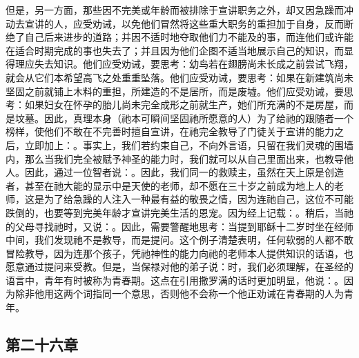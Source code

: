 但是，另一方面，那些因不完美或年龄而被排除于宣讲职务之外，却又因急躁而冲动去宣讲的人，应受劝诫，以免他们冒然将这些重大职务的重担加于自身，反而断绝了自己后来进步的道路；并因不适时地夺取他们力不能及的事，而连他们或许能在适合时期完成的事也失去了；并且因为他们企图不适当地展示自己的知识，而显得理应失去知识。他们应受劝诫，要思考：幼鸟若在翅膀尚未长成之前尝试飞翔，就会从它们本希望高飞之处重重坠落。他们应受劝诫，要思考：如果在新建筑尚未坚固之前就铺上木料的重担，所建造的不是居所，而是废墟。他们应受劝诫，要思考：如果妇女在怀孕的胎儿尚未完全成形之前就生产，她们所充满的不是房屋，而是坟墓。因此，真理本身（祂本可瞬间坚固祂所愿意的人）为了给祂的跟随者一个榜样，使他们不敢在不完善时擅自宣讲，在祂完全教导了门徒关于宣讲的能力之后，立即加上：。事实上，我们若约束自己，不向外言语，只留在我们灵魂的围墙内，那么当我们完全被赋予神圣的能力时，我们就可以从自己里面出来，也教导他人。因此，通过一位智者说：。因此，我们同一的救赎主，虽然在天上原是创造者，甚至在祂大能的显示中是天使的老师，却不愿在三十岁之前成为地上人的老师，这是为了给急躁的人注入一种最有益的敬畏之情，因为连祂自己，这位不可能跌倒的，也要等到完美年龄才宣讲完美生活的恩宠。因为经上记载：。稍后，当祂的父母寻找祂时，又说：。因此，需要警醒地思考：当提到耶稣十二岁时坐在经师中间，我们发现祂不是教导，而是提问。这个例子清楚表明，任何软弱的人都不敢冒险教导，因为连那个孩子，凭祂神性的能力向祂的老师本人提供知识的话语，也愿意通过提问来受教。但是，当保禄对他的弟子说：时，我们必须理解，在圣经的语言中，青年有时被称为青春期。这点在引用撒罗满的话时更加明显，他说：。因为除非他用这两个词指同一个意思，否则他不会称一个他正劝诫在青春期的人为青年。\par


\subsection{第二十六章}

\par

